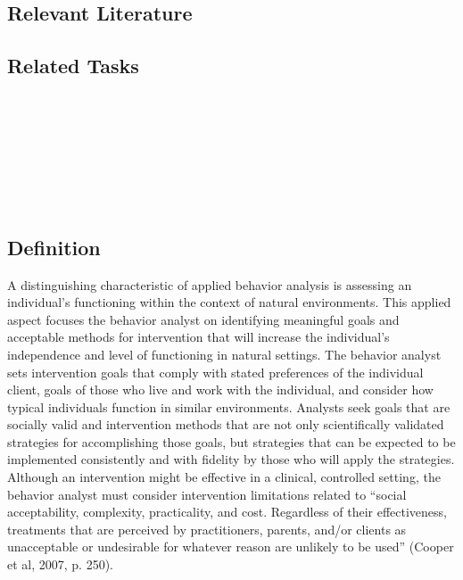 \subsection{Relevant Literature}
\begin{refsection}
\nocite{athens2010investigation,
        cooper2007applied,
        sweeney2013effects,
        vollmer1999evaluating}
\printbibliography[heading=none]
\end{refsection}
%
\subsection{Related Tasks}
\fourdTwo{}\\
\fourdEighteen{}\\
\fourdNineteen{}\\
\fouriSix{}\\
\fourjSix{}\\
\fourjSeven{}\\
%
\clearpage \section[\fourjEight{}]{\fourjEight{}%
              }
\subsection{Definition}
A distinguishing characteristic of applied behavior analysis is assessing an individual's functioning within the context of natural environments. This applied aspect focuses the behavior analyst on identifying meaningful goals and acceptable methods for intervention that will increase the individual's independence and level of functioning in natural settings. The behavior analyst sets intervention goals that comply with stated preferences of the individual client, goals of those who live and work with the individual, and consider how typical individuals function in similar environments. Analysts seek goals that are socially valid and intervention methods that are not only scientifically validated strategies for accomplishing those goals, but strategies that can be expected to be implemented consistently and with fidelity by those who will apply the strategies. Although an intervention might be effective in a clinical, controlled setting, the behavior analyst must consider intervention limitations related to ``social acceptability, complexity, practicality, and cost. Regardless of their effectiveness, treatments that are perceived by practitioners, parents, and/or clients as unacceptable or undesirable for whatever reason are unlikely to be used'' (Cooper et al, 2007, p. 250).
%

